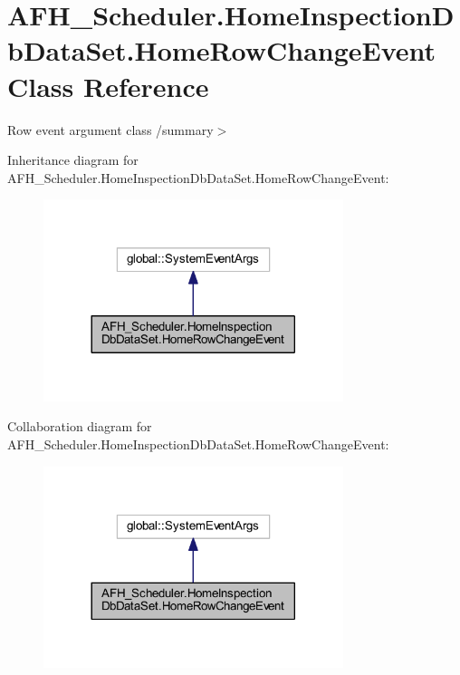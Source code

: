 \section{A\+F\+H\+\_\+\+Scheduler.\+Home\+Inspection\+Db\+Data\+Set.\+Home\+Row\+Change\+Event Class Reference}
\label{class_a_f_h___scheduler_1_1_home_inspection_db_data_set_1_1_home_row_change_event}


Row event argument class /summary$>$  




Inheritance diagram for A\+F\+H\+\_\+\+Scheduler.\+Home\+Inspection\+Db\+Data\+Set.\+Home\+Row\+Change\+Event\+:
\nopagebreak
\begin{figure}[H]
\begin{center}
\leavevmode
\includegraphics[width=248pt]{class_a_f_h___scheduler_1_1_home_inspection_db_data_set_1_1_home_row_change_event__inherit__graph}
\end{center}
\end{figure}


Collaboration diagram for A\+F\+H\+\_\+\+Scheduler.\+Home\+Inspection\+Db\+Data\+Set.\+Home\+Row\+Change\+Event\+:
\nopagebreak
\begin{figure}[H]
\begin{center}
\leavevmode
\includegraphics[width=248pt]{class_a_f_h___scheduler_1_1_home_inspection_db_data_set_1_1_home_row_change_event__coll__graph}
\end{center}
\end{figure}
